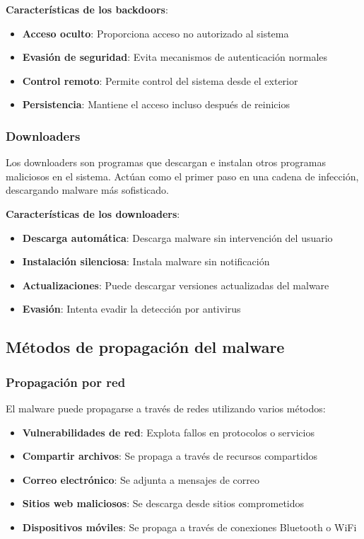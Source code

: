 \textbf{Características de los backdoors}:
\begin{itemize}
    \item \textbf{Acceso oculto}: Proporciona acceso no autorizado al sistema
    \item \textbf{Evasión de seguridad}: Evita mecanismos de autenticación normales
    \item \textbf{Control remoto}: Permite control del sistema desde el exterior
    \item \textbf{Persistencia}: Mantiene el acceso incluso después de reinicios
\end{itemize}

\subsubsection{Downloaders}

Los downloaders son programas que descargan e instalan otros programas maliciosos en el sistema. Actúan como el primer paso en una cadena de infección, descargando malware más sofisticado.

\textbf{Características de los downloaders}:
\begin{itemize}
    \item \textbf{Descarga automática}: Descarga malware sin intervención del usuario
    \item \textbf{Instalación silenciosa}: Instala malware sin notificación
    \item \textbf{Actualizaciones}: Puede descargar versiones actualizadas del malware
    \item \textbf{Evasión}: Intenta evadir la detección por antivirus
\end{itemize}

\subsection{Métodos de propagación del malware}

\subsubsection{Propagación por red}

El malware puede propagarse a través de redes utilizando varios métodos:

\begin{itemize}
    \item \textbf{Vulnerabilidades de red}: Explota fallos en protocolos o servicios
    \item \textbf{Compartir archivos}: Se propaga a través de recursos compartidos
    \item \textbf{Correo electrónico}: Se adjunta a mensajes de correo
    \item \textbf{Sitios web maliciosos}: Se descarga desde sitios comprometidos
    \item \textbf{Dispositivos móviles}: Se propaga a través de conexiones Bluetooth o WiFi
\end{itemize}

